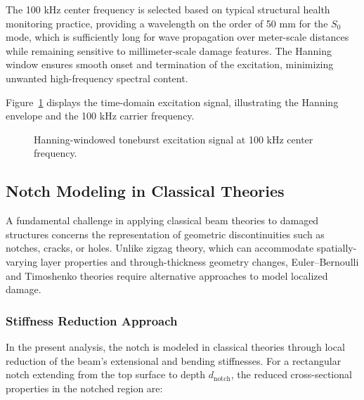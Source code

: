 \documentclass[12pt,a4paper]{report}
\begin{document}
The 100 kHz center frequency is selected based on typical structural health monitoring practice, providing a wavelength on the order of 50 mm for the $S_0$ mode, which is sufficiently long for wave propagation over meter-scale distances while remaining sensitive to millimeter-scale damage features. The Hanning window ensures smooth onset and termination of the excitation, minimizing unwanted high-frequency spectral content.

Figure~\ref{fig:excitation_signal} displays the time-domain excitation signal, illustrating the Hanning envelope and the 100 kHz carrier frequency.

\begin{figure}[h]
\centering
{}
\caption{Hanning-windowed toneburst excitation signal at 100 kHz center frequency.}
\label{fig:excitation_signal}
\end{figure}

\subsection{Notch Modeling in Classical Theories}

A fundamental challenge in applying classical beam theories to damaged structures concerns the representation of geometric discontinuities such as notches, cracks, or holes. Unlike zigzag theory, which can accommodate spatially-varying layer properties and through-thickness geometry changes, Euler--Bernoulli and Timoshenko theories require alternative approaches to model localized damage.

\subsubsection{Stiffness Reduction Approach}

In the present analysis, the notch is modeled in classical theories through local reduction of the beam's extensional and bending stiffnesses. For a rectangular notch extending from the top surface to depth $d_{\text{notch}}$, the reduced cross-sectional properties in the notched region are:
\end{document}
